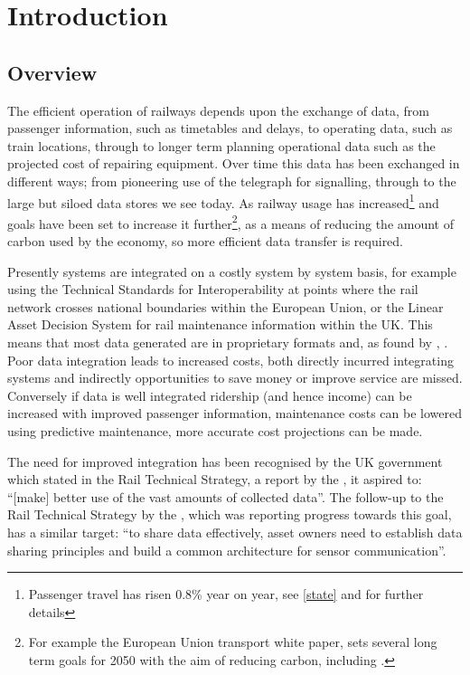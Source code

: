 \chapter{Introduction}\label{ch:intro}
\section{Overview}
The efficient operation of railways depends upon the exchange of data, from passenger information, such as timetables and delays, to operating data, such as train locations, through to longer term planning operational data such as the projected cost of repairing equipment. Over time this data has been exchanged in different ways; from pioneering use of the telegraph for signalling, through to the large but siloed data stores we see today. As railway usage has increased\footnote{Passenger travel has risen 0.8\% year on year, see \autoref{state} and \citep{OfficeofRoad&Rail2016} for further details} and goals have been set to increase it further\footnote{For example the European Union transport white paper, \citet{EC2011} sets several long term goals for 2050 with the aim of reducing carbon, including .}, as a means of reducing the amount of carbon used by the economy, so more efficient data transfer is required. 

Presently systems are integrated on a costly system by system basis, for example using the Technical Standards for Interoperability at points where the rail network crosses national boundaries within the European Union, or the Linear Asset Decision System for rail maintenance information within the UK. This means that most data generated are in proprietary formats and, as found by \citet{Kopf2010}, . Poor data integration leads to increased costs, both directly incurred integrating systems and indirectly opportunities to save money or improve service are missed. Conversely if data is well integrated ridership (and hence income) can be increased with improved passenger information, maintenance costs can be lowered using predictive maintenance, more accurate cost projections can be made.

The need for improved integration has been recognised by the UK government which stated in the Rail Technical Strategy, a report by the \citet{TechnicalStrategyLeadershipGroup2012b}, it aspired to: ``[make] better use of the vast amounts of collected data''. The follow-up to the Rail Technical Strategy by the \citet{RDG2017}, which was reporting progress towards this goal, has a similar target: ``to share data effectively, asset owners need to establish data sharing principles and build a common architecture for sensor communication''.

